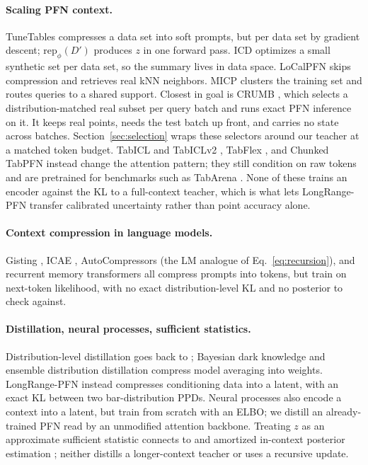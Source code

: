 \documentclass{article}
\newcommand{\Dfar}{D'}
\newcommand{\rep}{\mathrm{rep}}
\begin{document}
\paragraph{Scaling PFN context.} TuneTables \citep{feuer2024tunetables}
compresses a data set into soft prompts, but per data set by gradient descent;
$\rep_\phi(\Dfar)$ produces $z$ in one forward pass. ICD \citep{ma2024icd}
optimizes a small synthetic set per data set, so the summary lives in data
space. LoCalPFN \citep{thomas2024localpfn} skips compression and retrieves real
kNN neighbors. MICP \citep{xu2024micp} clusters the training set and routes
queries to a shared support. Closest in goal is CRUMB \citep{heredge2026crumb},
which selects a distribution-matched real subset per query batch and runs exact
PFN inference on it. It keeps real points, needs the test batch up front, and
carries no state across batches. Section~\ref{sec:selection} wraps these
selectors around our teacher at a matched token budget. TabICL and TabICLv2
\citep{qu2025tabicl, qu2026tabiclv2}, TabFlex \citep{zeng2025tabflex}, and
Chunked TabPFN \citep{sergazinov2025chunked} instead change the attention
pattern; they still condition on raw tokens and are pretrained for benchmarks
such as TabArena \citep{erickson2025tabarena}. None of these trains an encoder
against the KL to a full-context teacher, which is what lets LongRange-PFN
transfer calibrated uncertainty rather than point accuracy alone.

\paragraph{Context compression in language models.} Gisting
\citep{mu2023gisting}, ICAE \citep{ge2023icae}, AutoCompressors
\citep{chevalier2023autocompressors} (the LM analogue of
Eq.~\eqref{eq:recursion}), and recurrent memory transformers
\citep{bulatov2022rmt} all compress prompts into tokens, but train on
next-token likelihood, with no exact distribution-level KL and no posterior to check
against.

\paragraph{Distillation, neural processes, sufficient statistics.}
Distribution-level distillation goes back to \citet{hinton2015distillation};
Bayesian dark knowledge \citep{korattikara2015darkknowledge} and ensemble
distribution distillation \citep{malinin2020edd} compress model averaging into
weights. LongRange-PFN instead compresses conditioning data into a latent, with
an exact KL between two bar-distribution PPDs. Neural processes
\citep{garnelo2018np, kim2019anp} also encode a context into a latent, but train
from scratch with an ELBO; we distill an already-trained PFN read by an
unmodified attention backbone. Treating $z$ as an approximate sufficient
statistic connects to \citet{chen2021nass} and amortized in-context posterior
estimation \citep{mittal2025amortized}; neither distills a longer-context
teacher or uses a recursive update.
\end{document}
